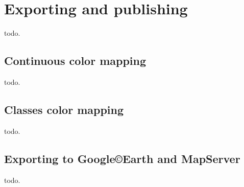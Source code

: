 \section{Exporting and publishing}\label{sec:export}

todo.

\subsection{Continuous color mapping}\label{ssec:colormapping}

todo.

\subsection{Classes color mapping}\label{ssec:classesmapping}

todo.

\subsection{Exporting to Google\copyright Earth and MapServer}\label{ssec:ge}

todo.
